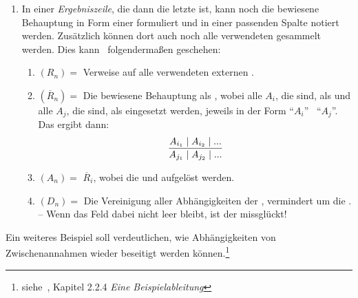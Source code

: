 {\begin{enumerate}
	Nun kann die Zeile beendet werden, oder es geht weiter mit:
	\begin{enumerate}
		\setcounter{enumii}{\value{Enumii}}%
		\item \label{item:Anwendung} $Z_n =$ Die Indizes aller $A_j$ (mit $j < i$), die eine  der  $\overline{R}_i$ sind, möglichst in der verwendeten Reihenfolge.
		-- Für jedes angegebene $j$ werden noch die Abhängigkeiten $D_j$ den Abhängigkeiten $D_i$ hinzugefügt.
		\item $A_i =$ (en) der  $\overline{R}_i$.
		-- Wenn diese  schon als  $A_j$ (mit $j < i$) vorhanden sind, können auch einfach deren Indizes eingetragen werden.
		Damit werden die Zusammenhänge und der Abschluss des es besser ersichtlich.
		\item $D_i =$ Die Verweise wurden schon in (\ref{item:Anwendung}) eingetragen.%
		\footnote{Wenn $D_n$ leer ist, dann ist $A_n$ allgemeingültig.}
	\end{enumerate}
	Der  muss so lange fortgeführt werden, bis alle  als  in der Spalte $(A_n)$ erschienen und dort jeweils nur von den gegebenen  abhängig sind.
	\item \label{item:Ergebniszeile} In einer \emph{Ergebniszeile}, die dann die letzte ist, kann noch die bewiesene Behauptung in Form einer  formuliert und in einer passenden Spalte notiert werden.
	Zusätzlich können dort auch noch alle verwendeten  gesammelt werden.
	Dies kann \textzB\ folgendermaßen geschehen:
	\begin{enumerate}
		\item $(R_n) =$ Verweise auf alle verwendeten externen .
		\item $(\overline{R}_n) =$ Die bewiesene Behauptung als , wobei alle $A_i$, die  sind, als  und alle $A_j$, die  sind, als  eingesetzt werden, jeweils in der Form \enquote{$A_i$} \textbzgl\ \enquote{$A_j$}.
		Das ergibt dann:
		\[ \frac{A_{i_1} \mid A_{i_2} \mid ...}{A_{j_1} \mid A_{j_2} \mid ...} \]
		\item $(A_n) =$ $\overline{R}_i$, wobei die  und  aufgelöst werden.
		\item $(D_n) =$ Die Vereinigung aller Abhängigkeiten der , vermindert um die .
		-- Wenn das Feld dabei nicht leer bleibt, ist der  missglückt!
	\end{enumerate}
\end{enumerate}
%
Ein weiteres Beispiel  soll verdeutlichen, wie Abhängigkeiten von Zwischenannahmen wieder beseitigt werden können.\footnote{siehe~\cite{bib:NatuerlichesSchliessen}, Kapitel 2.2.4 \emph{Eine Beispielableitung}}

}
